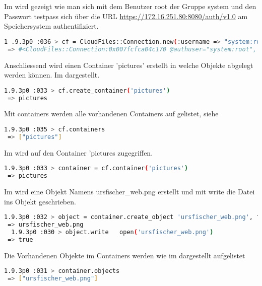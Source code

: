 Im  wird gezeigt wie man sich mit dem Benutzer root der Gruppe system und den Passwort testpass sich über die URL \url{https://172.16.251.80:8080/auth/v1.0} am Speichersystem authentifiziert.

\begin{lstlisting}[label=logon, language=Bash, caption=Anmelden an Speichersystem] 
 1 .9.3p0 :036 > cf = CloudFiles::Connection.new(:username => "system:root", :api_key => "testpass", :auth_url => "https://172.16.251.80:8080/auth/v1.0")
 => #<CloudFiles::Connection:0x007fcfca04c170 @authuser="system:root", @authkey="testpass", @auth_url="https://172.16.251.80:8080/auth/v1.0", @retry_auth=true, @snet=nil, @proxy_host=nil, @proxy_port=nil, @authok=true, @http={}, @storagehost="172.16.251.80", @storagepath="/v1/AUTH_system", @storageport=8080, @storagescheme="https", @authtoken="AUTH_tk4bc3d45cef364606ad521708101ad574"> 
\end{lstlisting}

Anschliessend wird einen Container 'pictures' erstellt in welche Objekte abgelegt werden können. Im  dargestellt.

\begin{lstlisting}[label=create_container, language=Bash, caption=Server bzw. Speicher den Ringen hinzufügen]
1.9.3p0 :033 > cf.create_container('pictures')
 => pictures
\end{lstlisting}

Mit containers werden alle vorhandenen Containers auf gelistet, siehe 
\begin{lstlisting}[label=list_contaners, language=Bash, caption=Auflisten der Vorhandenen Containers]
1.9.3p0 :035 > cf.containers
 => ["pictures"] 
\end{lstlisting}

Im  wird auf den Container 'pictures zugegriffen.
\begin{lstlisting}[label=access_container, language=Bash, caption=Zugreifen auf den Container]
1.9.3p0 :033 > container = cf.container('pictures')
 => pictures 
 \end{lstlisting}

Im  wird eine Objekt Namens ursfischer\_web.png erstellt und mit write  die Datei ins Objekt geschrieben.

\begin{lstlisting}[label=create_object, language=Bash, caption=Erstellt ein Object und schreibt den Inhalt ins Objekt] 
  1.9.3p0 :032 > object = container.create_object 'ursfischer_web.png', false
 => ursfischer_web.png
  1.9.3p0 :030 > object.write   open('ursfischer_web.png')
 => true  
\end{lstlisting}

Die Vorhandenen Objekte im Containers werden wie im  dargestellt aufgelistet

\begin{lstlisting}[label=list_objects, language=Bash, caption=Objekte des Containers auflisten]
 1.9.3p0 :031 > container.objects
 => ["ursfischer_web.png"] 
\end{lstlisting}  